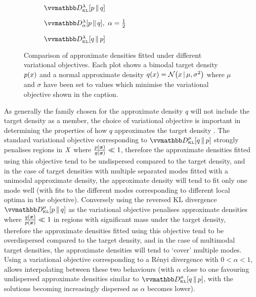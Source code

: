 \begin{figure}[t]
\centering
\begin{subfigure}[b]{.32\linewidth}
\centering
{}
\caption{$\kldiv[\lambda]{\tgtdens}{q}$}
\label{sfig:var-obj-kl-pq}
\end{subfigure}
\begin{subfigure}[b]{.32\linewidth}
\centering
{}
\caption{$\rdiv[\lambda]{\alpha}{\tgtdens}{q},~\alpha=\frac{1}{2}$}
\label{sfig:var-obj-renyi}
\end{subfigure}
\begin{subfigure}[b]{.32\linewidth}
\centering
{}
\caption{$\kldiv[\lambda]{q}{\tgtdens}$}
\label{sfig:var-obj-kl-qp}
\end{subfigure}
\caption[Variational objective comparison.]{Comparison of approximate densities fitted under different variational objectives. Each plot shows a bimodal target density $p(x)$ and a normal approximate density $q(x) = \nrm{x \gvn \mu,\sigma^2}$ where $\mu$ and $\sigma$ have been set to values which minimise the variational objective shown in the caption.}
\label{fig:variational-objective-comparison}
\end{figure}

As generally the family chosen for the approximate density $q$ will not include the target density as a member, the choice of variational objective is important in determining the properties of how $q$ approximates the target density \citep{bishop2006pattern}. The standard variational objective corresponding to $\kldiv[\mu]{q}{\tgtdens}$ strongly penalises regions in $\mathit{X}$ where $\frac{p(\boldsymbol{x})}{q(\boldsymbol{x})} \ll  1$, therefore the approximate densities fitted using this objective tend to be undispersed compared to the target density, and in the case of target densities with multiple separated modes fitted with a unimodal approximate density, the approximate density will tend to fit only one mode well (with fits to the different modes corresponding to different local optima in the objective). Conversely using the reversed \ac{KL} divergence $\kldiv[\mu]{\tgtdens}{q}$ as the variational objective penalises approximate densities where $\frac{q(\boldsymbol{x})}{p(\boldsymbol{x})} \ll 1$ in regions with significant mass under the target density, therefore the approximate densities fitted using this objective tend to be overdispersed compared to the target density, and in the case of multimodal target densities, the approximate densities will tend to `cover' multiple modes. Using a variational objective corresponding to a R\'{e}nyi divergence with $0 < \alpha < 1$, allows interpolating between these two behaviours (with $\alpha$ close to one favouring undispersed approximate densities similar to $\kldiv[\mu]{q}{\tgtdens}$, with the solutions becoming increasingly dispersed as $\alpha$ becomes lower). 

